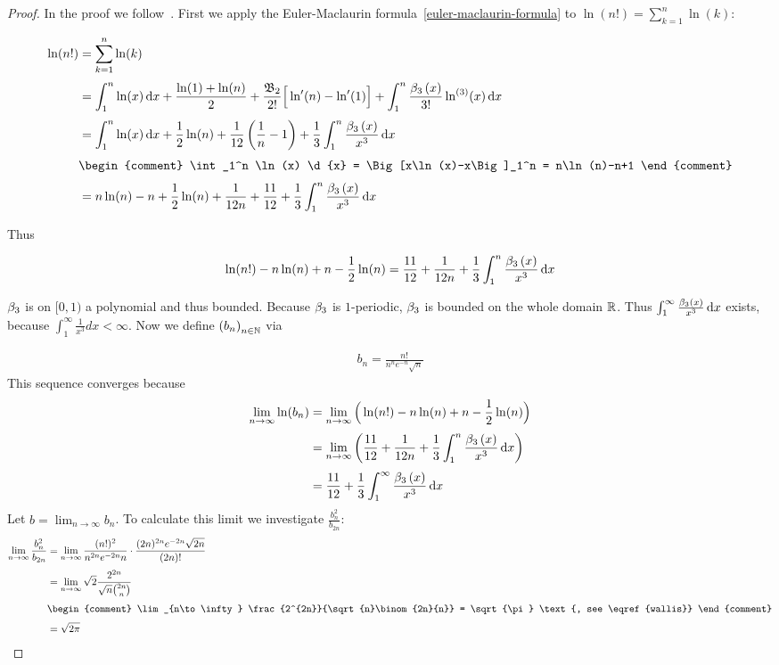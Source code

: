 \begin{proof}
  In the proof we follow~\cite[pp. 227-228]{koenigsberger}. First we apply the Euler-Maclaurin formula~\eqref{euler-maclaurin-formula} to $\ln(n!)=\sum_{k=1}^n \ln(k)$:

  \begin{align}
    \ln(n!) & = \sum_{k=1}^n \ln(k) \nl
    & = \int_1^n \ln(x) \d{x} + \frac{\ln(1)+\ln(n)}{2} + \frac{\bn[2]}{2!} \Big[\ln'(n)-\ln'(1)\Big] + \int_1^n \frac{\bp[3]{x}}{3!} \ln^{(3)}(x) \d{x} \nl
    &= \int_1^n \ln(x) \d{x} + \frac 12 \ln(n) + \frac{1}{12} \left(\frac 1n - 1\right) + \frac 13 \int_1^n \frac{\bp[3]{x}}{x^3} \d{x} \nl
    & \begin{comment}
      \int_1^n \ln(x) \d{x} = \Big[x\ln(x)-x\Big]_1^n = n\ln(n)-n+1
    \end{comment} \nonumber \nl
    &= n\ln(n)-n+\frac 12 \ln(n) + \frac{1}{12n} + \frac{11}{12} + \frac{1}{3} \int_1^n \frac{\bp[3]{x}}{x^3}\d{x} 
  \end{align}

  \noindent Thus

  \begin{align}
    \ln(n!) - n\ln(n) + n - \frac 12 \ln(n) = \frac{11}{12} + \frac{1}{12n} + \frac 13 \int_1^n \frac{\bp[3]{x}}{x^3} \d{x}
  \end{align}

  \includeplot{beta3}{The function $\bp[3]{x}$ on the domain $[0,1)$.}

  $\bps[3]$ is on $[0,1)$ a polynomial and thus bounded. Because $\bps[3]$ is $1$-periodic, $\bps[3]$ is bounded on the whole domain $\R$. Thus $\int_1^\infty \frac{\bp[3]{x}}{x^3} \d{x}$ exists, because $\int_1^\infty \frac 1{x^3} d{x} < \infty$. Now we define $\seq{b_n}$ via

  \begin{align}
    b_n = \frac{n!}{n^n e^{-n} \sqrt{n}}
  \end{align}
  This sequence converges because
  \begin{align}
    \lim_{n\to\infty} \ln(b_n) & = \lim_{n\to\infty} \Big( \ln(n!) -n \ln(n) + n - \frac 12\ln(n) \Big) \nl
    & = \lim_{n\to\infty} \left( \frac{11}{12} + \frac{1}{12n} + \frac 13\int_1^n \frac{\bp[3]{x}}{x^3} \d{x}\right) \nl
    & = \frac{11}{12} + \frac 13\int_1^{\infty} \frac{\bp[3]{x}}{x^3} \d{x}
  \end{align}
  Let $b=\lim_{n\to\infty} b_n$. To calculate this limit we investigate $\tfrac{b_n^2}{b_{2n}}$:
  \begin{align}
    \lim_{n\to\infty} \frac{b_n^2}{b_{2n}} &= \lim_{n\to\infty} \frac{(n!)^2}{n^{2n}e^{-2n} n} \cdot \frac{(2n)^{2n} e^{-2n} \sqrt{2n}}{(2n)!} \nl
    &= \lim_{n\to\infty} \sqrt{2} \frac{2^{2n}}{\sqrt{n}\binom{2n}{n}} \nl
    & \begin{comment}
    \lim_{n\to\infty} \frac{2^{2n}}{\sqrt{n}\binom{2n}{n}} = \sqrt{\pi} \text{, see \eqref{wallis}}
    \end{comment} \nonumber \nl
    & = \sqrt{2\pi}
  \end{align}


\end{proof}
